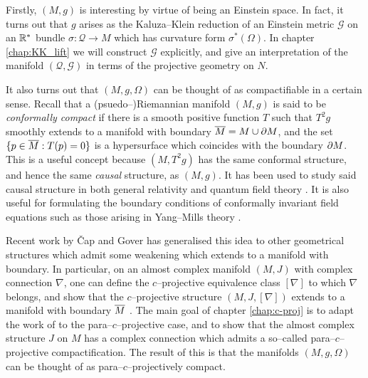 
Firstly, $(M,g)$ is interesting by virtue of being an Einstein
space. In fact, it turns out that $g$ arises as the Kaluza--Klein reduction of an Einstein metric $\mathcal{G}$ on an $\mathbb{R}^*$ bundle $\sigma:\mathcal{Q}\rightarrow M$ which has curvature form $\sigma^*(\Omega)$. In chapter \ref{chap:KK_lift} we will construct $\mathcal{G}$ explicitly, and give an interpretation of the manifold $(\mathcal{Q},\mathcal{G})$ in terms of the projective geometry on $N$.

It also turns out that $(M,g,\Omega)$ can be thought of as compactifiable in a certain sense. Recall that a (psuedo--)Riemannian manifold $(M,g)$ is said to be \textit{conformally compact} if there is a smooth positive function $T$ such that $T^2g$ smoothly extends to a manifold with boundary $\overline{M}=M\cup\partial M$, and the set $\{p\in\overline{M}:T(p)=0\}$ is a hypersurface which coincides with the boundary $\partial M$.  This is a useful concept because $(M,T^2g)$ has the same conformal structure, and hence the same \textit{causal} structure, as $(M,g)$. It has been used to study said causal structure in both general relativity \cite{penrose65} and quantum field theory \cite{witten}. It is also useful for formulating the boundary conditions of conformally invariant field equations such as those arising in Yang--Mills theory \cite{uhlen}.

Recent work by \v Cap and Gover \cite{CG0,CG} has generalised this idea to other geometrical structures which admit some weakening which extends to a manifold with boundary. In particular, on an almost complex manifold $(M,J)$ with complex connection $\nabla$, one can define the $c$--projective equivalence class $[\nabla]$ to which $\nabla$ belongs, and show that the $c$--projective structure $(M,J,[\nabla])$ extends to a manifold with boundary $\overline{M}$ \cite{CG}. The main goal of chapter \ref{chap:c-proj} is to adapt the work of \cite{CG} to the para--$c$--projective case, and to show that the almost complex structure $J$ on $M$ has a complex connection which admits a so--called para--$c$--projective compactification. The result of this is that the manifolds $(M,g,\Omega)$ can be thought of as para--$c$--projectively compact.


